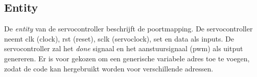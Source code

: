 \subsection{Entity}
De \textit{entity} van de servocontroller beschrijft de poortmapping. De servocontroller neemt clk (clock), rst (reset), sclk (servoclock), set en data als inputs. De servocontroller zal het \textit{done} signaal en het aanstuursignaal (pwm) als uitput genereren. Er is voor gekozen om een generische variabele adres toe te voegen, zodat de code kan hergebruikt worden voor verschillende adressen.
